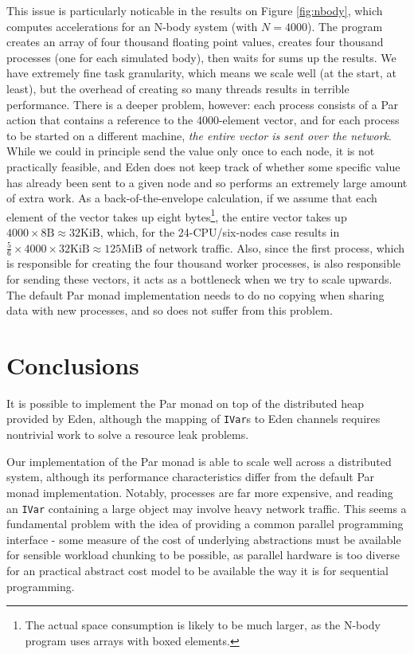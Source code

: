 \documentclass[a4paper, oneside, final]{memoir}
\begin{document}
This issue is particularly noticable in the results on Figure
\ref{fig:nbody}, which computes accelerations for an N-body system
(with $N=4000$).  The program creates an array of four thousand
floating point values, creates four thousand processes (one for each
simulated body), then waits for sums up the results.  We have
extremely fine task granularity, which means we scale well (at the
start, at least), but the overhead of creating so many threads results
in terrible performance.  There is a deeper problem, however: each
process consists of a Par action that contains a reference to the
4000-element vector, and for each process to be started on a different
machine, \textit{the entire vector is sent over the network}.  While
we could in principle send the value only once to each node, it is not
practically feasible, and Eden does not keep track of whether some
specific value has already been sent to a given node and so performs
an extremely large amount of extra work.  As a back-of-the-envelope
calculation, if we assume that each element of the vector takes up
eight bytes\footnote{The actual space consumption is likely to be much
  larger, as the N-body program uses arrays with boxed elements.}, the
entire vector takes up $4000\times8\text{B}\approx 32\text{KiB}$,
which, for the 24-CPU/six-nodes case results in $\frac{5}{6} \times
4000 \times 32\text{KiB}\approx 125\text{MiB}$ of network traffic.
Also, since the first process, which is responsible for creating the
four thousand worker processes, is also responsible for sending these
vectors, it acts as a bottleneck when we try to scale upwards.  The
default Par monad implementation needs to do no copying when sharing
data with new processes, and so does not suffer from this problem.

\section{Conclusions}

It is possible to implement the Par monad on top of the distributed
heap provided by Eden, although the mapping of \texttt{IVar}s to Eden
channels requires nontrivial work to solve a resource leak problems.

Our implementation of the Par monad is able to scale well across a
distributed system, although its performance characteristics differ
from the default Par monad implementation.  Notably, processes are far
more expensive, and reading an \texttt{IVar} containing a large object
may involve heavy network traffic.  This seems a fundamental problem
with the idea of providing a common parallel programming interface -
some measure of the cost of underlying abstractions must be available
for sensible workload chunking to be possible, as parallel hardware is
too diverse for an practical abstract cost model to be available the
way it is for sequential programming.
\end{document}
